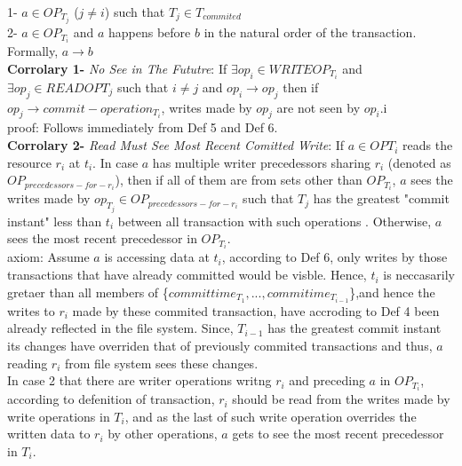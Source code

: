 \documentclass[a4paper, 11pt]{article}
\begin{document}
\hspace{7mm} 1- $a \in OP_{T_j}$ ($j \neq i$) such that $T_j \in T_{commited}$ \\

\hspace{7mm} 2- $a \in OP_{T_i}$ and $a$ happens before $b$ in the natural order of the transaction. Formally, $a \rightarrow b$\\
 

\textbf{Corrolary 1-} \emph{No See in The Fututre}: If $ \exists op_i \in WRITEOP_{T_i}$ and $\exists op_j \in READOP{T_j}$ such that $i \neq j$ and $op_i \rightarrow op_j$ then if $op_j \rightarrow commit-operation_{T_i}$, writes made by $op_j$ are not seen by $op_i$.i\\

proof: Follows immediately from Def 5 and Def 6.\\

\textbf{Corrolary 2-} \emph{Read Must See Most Recent Comitted Write}: If $a \in OP{T_i}$ reads the resource $r_i$ at $t_i$. In case $a$ has multiple writer precedessors sharing $r_i$ (denoted as $OP_{precedessors-for-r_i}$), then if all of them are from sets other than $OP_{T_i}$, $a$ sees the writes made by $op_{T_j} \in OP_{precedessors-for-r_i}$ such that $T_j$ has the greatest "commit instant" less than $t_i$ between all transaction with such operations . Otherwise, $a$ sees the most recent precedessor in $OP_{T_i}$. \\

axiom: Assume $a$ is accessing data at $t_i$, according to Def 6, only writes by those transactions that have already committed would be visble. Hence, $t_i$ is neccasarily gretaer than all members of \{$committime_{T_1}, ..., commitime_{T_{i-1}}$\},and hence the writes to $r_i$ made by these commited transaction, have accroding to Def 4 been already reflected in the file system. Since, $T_{i-1}$ has the greatest commit instant its changes have overriden that of previously commited transactions and thus, $a$ reading $r_i$ from file system sees these changes.\\

In case 2 that there are writer operations writng $r_i$ and preceding $a$ in $OP_{T_i}$, according to defenition of transaction, $r_i$ should be read from the writes made by write operations in $T_i$, and as the last of such write operation overrides the written data to $r_i$ by other operations, $a$ gets to see the most recent precedessor in $T_i$.\\   
\end{document}
